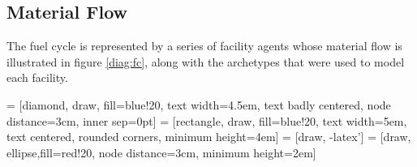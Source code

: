 \subsection{Material Flow}

The fuel cycle is represented by a series of facility agents whose material 
flow is illustrated in figure \ref{diag:fc}, along with
the \Cyclus archetypes that were used to model each facility.

 = [diamond, draw, fill=blue!20, 
text width=4.5em, text badly centered, node distance=3cm, inner sep=0pt]
 = [rectangle, draw, fill=blue!20, 
text width=5em, text centered, rounded corners, minimum height=4em]
 = [draw, -latex']
 = [draw, ellipse,fill=red!20, node distance=3cm,
minimum height=2em]


